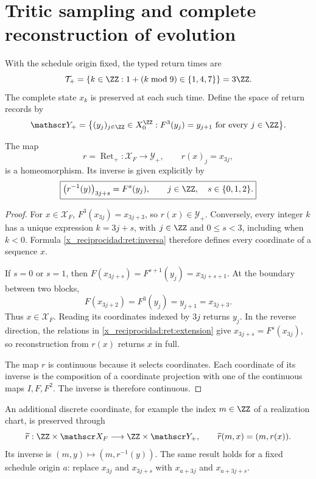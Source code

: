 \section{Tritic sampling and complete reconstruction of evolution}

With the schedule origin fixed, the typed return times are
\[
 \mathcal T_+
 =\{k\in\ZZ:1+(k\bmod 9)\in\{1,4,7\}\}=3\ZZ.
\]
The complete state \(x_k\) is preserved at each such time.
Define the space of return records by
\begin{equation}
 \mathscr Y_+
 =\bigl\{(y_j)_{j\in\ZZ}\in X_0^{\ZZ}:
                 F^3(y_j)=y_{j+1}\text{ for every }j\in\ZZ\bigr\}.
 \label{x_reciprocidad:ret:registros}
\end{equation}

\begin{theorem}
\label{x_reciprocidad:ret:homeomorfismo}
The map
\[
 r=\operatorname{Ret}_+:\mathscr X_F\longrightarrow\mathscr Y_+,
 \qquad r(x)_j=x_{3j},
\]
is a homeomorphism. Its inverse is given explicitly by
\begin{equation}
 \boxed{
  \bigl(r^{-1}(y)\bigr)_{3j+s}=F^s(y_j),
  \qquad j\in\ZZ,\quad s\in\{0,1,2\}.}
 \label{x_reciprocidad:ret:inversa}
\end{equation}
\end{theorem}
\begin{proof}
For \(x\in\mathscr X_F\),
\(F^3(x_{3j})=x_{3j+3}\), so \(r(x)\in\mathscr Y_+\).
Conversely, every integer \(k\) has a unique expression
\(k=3j+s\), with \(j\in\ZZ\) and \(0\le s<3\), including when
\(k<0\). Formula \eqref{x_reciprocidad:ret:inversa} therefore defines every
coordinate of a sequence \(x\).

If \(s=0\) or \(s=1\), then
\(F(x_{3j+s})=F^{s+1}(y_j)=x_{3j+s+1}\).
At the boundary between two blocks,
\[
 F(x_{3j+2})=F^3(y_j)=y_{j+1}=x_{3j+3}.
\]
Thus \(x\in\mathscr X_F\).
Reading its coordinates indexed by \(3j\) returns \(y_j\).
In the reverse direction, the relations in \eqref{x_reciprocidad:ret:extension} give
\(x_{3j+s}=F^s(x_{3j})\), so reconstruction from \(r(x)\)
returns \(x\) in full.

The map \(r\) is continuous because it selects coordinates.
Each coordinate of its inverse is the composition of a coordinate
projection with one of the continuous maps \(I,F,F^2\).
The inverse is therefore continuous.
\end{proof}

An additional discrete coordinate, for example the index \(m\in\ZZ\)
of a realization chart, is preserved through
\[
 \widetilde r:\ZZ\times\mathscr X_F
 \longrightarrow\ZZ\times\mathscr Y_+,
 \qquad \widetilde r(m,x)=(m,r(x)).
\]
Its inverse is \((m,y)\mapsto(m,r^{-1}(y))\).
The same result holds for a fixed schedule origin \(a\):
replace \(x_{3j}\) and \(x_{3j+s}\) with
\(x_{a+3j}\) and \(x_{a+3j+s}\).

